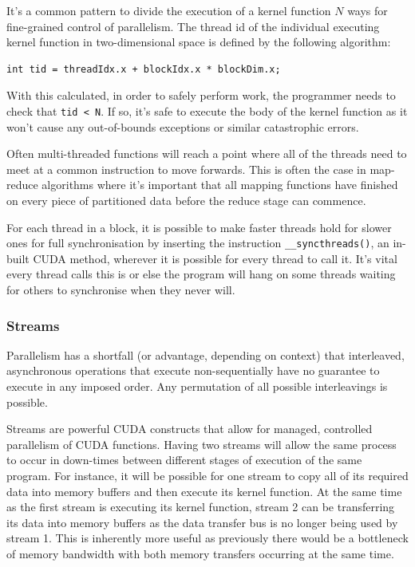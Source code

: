 \documentclass[conference]{IEEEtran}
\begin{document}
It's a common pattern to divide the execution of a kernel function $N$ ways for fine-grained control of parallelism. The thread id of the individual executing kernel function in two-dimensional space is defined by the following algorithm:

\begin{lstlisting}[breaklines]
    int tid = threadIdx.x + blockIdx.x * blockDim.x; 
\end{lstlisting}

With this calculated, in order to safely perform work, the programmer needs to check that \verb|tid < N|. If so, it's safe to execute the body of the kernel function as it won't cause any out-of-bounds exceptions or similar catastrophic errors.

Often multi-threaded functions will reach a point where all of the threads need to meet at a common instruction to move forwards. This is often the case in map-reduce algorithms where it's important that all mapping functions have finished on every piece of partitioned data before the reduce stage can commence.

For each thread in a block, it is possible to make faster threads hold for slower ones for full synchronisation by inserting the instruction \texttt{\_\_syncthreads()}, an in-built CUDA method, wherever it is possible for every thread to call it. It's vital every thread calls this is or else the program will hang on some threads waiting for others to synchronise when they never will.

\subsubsection{Streams}

Parallelism has a shortfall (or advantage, depending on context) that interleaved, asynchronous operations that execute non-sequentially have no guarantee to execute in any imposed order. Any permutation of all possible interleavings is possible.

Streams are powerful CUDA constructs that allow for managed, controlled parallelism of CUDA functions. Having two streams will allow the same process to occur in down-times between different stages of execution of the same program. For instance, it will be possible for one stream to copy all of its required data into memory buffers and then execute its kernel function. At the same time as the first stream is executing its kernel function, stream 2 can be transferring its data into memory buffers as the data transfer bus is no longer being used by stream 1. This is inherently more useful as previously there would be a bottleneck of memory bandwidth with both memory transfers occurring at the same time.
\end{document}
